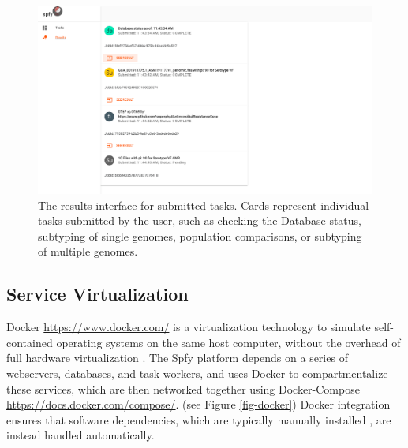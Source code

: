 \documentclass{article}
\begin{document}
\begin{figure}[!htb]
\begin{center}
\includegraphics[width=\textwidth]{images/results.png}
\end{center}
\caption{The results interface for submitted tasks. Cards represent individual tasks submitted by the user, such as checking the Database status, subtyping of single genomes, population comparisons, or subtyping of multiple genomes.}
\label{fig-results}
\end{figure}

\subsection{Service Virtualization}



Docker \url{https://www.docker.com/} is a virtualization technology to simulate self-contained operating systems on the same host computer, without the overhead of full hardware virtualization \cite{felter2015updated}.
The Spfy platform depends on a series of webservers, databases, and task workers, and uses Docker to compartmentalize these services, which are then networked together using Docker-Compose \url{https://docs.docker.com/compose/}.
(see Figure \ref{fig-docker})
Docker integration ensures that software dependencies, which are typically manually installed \cite{doi:10.1093/bioinformatics/btu153,laing2010pan,inouye2014srst2,naccache2014cloud}, are instead handled automatically.
\end{document}

